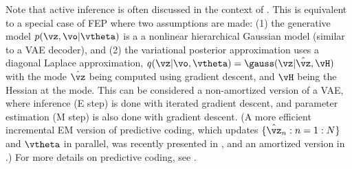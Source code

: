 
Note that active inference is often discussed in the context of
.
This is equivalent to a special case of FEP
where two assumptions are made:
(1)  the generative model $p(\vz,\vo|\vtheta)$ is a 
a  nonlinear hierarchical Gaussian  model
(similar to a VAE decoder),
and (2) the variational posterior approximation
uses a diagonal Laplace approximation,
$q(\vz|\vo,\vtheta) =\gauss(\vz|\hat{\vz},\vH)$
with the mode $\hat{\vz}$
being computed using gradient descent, and $\vH$ being the Hessian
at the mode.
This can be considered a non-amortized version of a VAE,
where inference (E step) is done with iterated gradient descent,
and parameter estimation (M step) is also done with gradient descent.
(A more efficient incremental EM version of predictive
coding, which updates $\{ \hat{\vz}_n: n=1:N\}$ and $\vtheta$ in parallel,
was recently presented in \citep{Salvatori2024iclr},
and an amortized version in \citep{Tscshantz2023}.)
For more details on predictive coding,
see
\citep{Rao1999predictive,Friston2003,Spratling2017,Hosseini2020pc,
  Millidge2021pc,Marino2021,Ororbia202,Salvatori2023,Salvatori2024iclr}.

